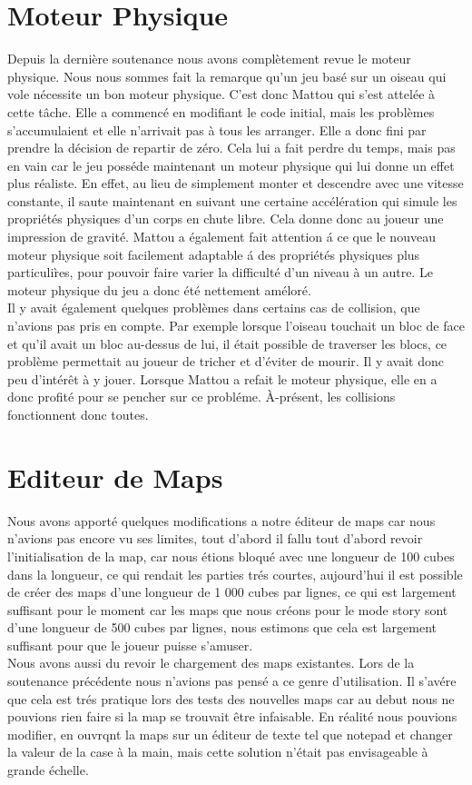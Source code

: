 \documentclass [11pt]{report}
\begin{document}
	\section{Moteur Physique}
		Depuis la derni\`ere soutenance nous avons compl\`etement revue le moteur physique. Nous nous sommes fait la remarque qu'un jeu bas\'e sur un oiseau qui vole n\'ecessite un bon moteur physique. C'est donc Mattou qui s'est attel\'ee \`a cette t\^ache. Elle a commenc\'e en modifiant le code initial, mais les probl\`emes s'accumulaient et elle n'arrivait pas \`a tous les arranger. Elle a donc fini par prendre la d\'ecision de repartir de z\'ero. Cela lui a fait perdre du temps, mais pas en vain car le jeu poss\'ede maintenant un moteur physique qui lui donne un effet plus r\'ealiste. En effet, au lieu de simplement monter et descendre avec une vitesse constante, il saute maintenant en suivant une certaine acc\'el\'eration qui simule les propri\'et\'es physiques d'un corps en chute libre. Cela donne donc au joueur une impression de gravit\'e. Mattou a \'egalement fait attention \'a ce que le nouveau moteur physique soit facilement adaptable \'a des propri\'et\'es physiques plus particuli\`res, pour pouvoir faire varier la difficult\'e d'un niveau \`a un autre. Le moteur physique du jeu a donc \'et\'e nettement am\'elor\'e. \\
		\indent Il y avait \'egalement quelques probl\`emes dans certains cas de collision, que n'avions pas pris en compte. Par exemple lorsque l'oiseau touchait un bloc de face et qu'il avait un bloc au-dessus de lui, il \'etait possible de traverser les blocs, ce probl\`eme permettait au joueur de tricher et d'\'eviter de mourir. Il y avait donc peu d'int\'er\^et \`a y jouer. Lorsque Mattou a refait le moteur physique, elle en a donc profit\'e pour se pencher sur ce probl\'eme. \`A-pr\'esent, les collisions fonctionnent donc toutes. 
	\section{Editeur de Maps}
		Nous avons apport\'e quelques modifications a notre \'editeur de maps car nous n'avions pas encore vu ses limites, tout d'abord il fallu tout d'abord revoir l'initialisation de la map, car nous \'etions bloqu\'e avec une longueur de 100 cubes dans la longueur, ce qui rendait les parties tr\'es courtes, aujourd'hui il est possible de cr\'eer des maps d'une longueur de 1 000 cubes par lignes, ce qui est largement suffisant pour le moment car les maps que nous cr\'eons pour le mode story sont d'une longueur de 500 cubes par lignes, nous estimons que cela est largement suffisant pour que le joueur puisse s'amuser.\\
		\indent Nous avons aussi du revoir le chargement des maps existantes. Lors de la soutenance pr\'ec\'edente nous n'avions pas pens\'e a ce genre d'utilisation. Il s'av\'ere que cela est tr\'es pratique lors des tests des nouvelles maps car au debut nous ne pouvions rien faire si la map se trouvait \^etre infaisable. En r\'ealit\'e nous pouvions modifier, en ouvrqnt la maps sur un \'editeur de texte tel que notepad et changer la valeur de la case \`a la main, mais cette solution n'\'etait pas envisageable \`a grande \'echelle.
\end{document}
